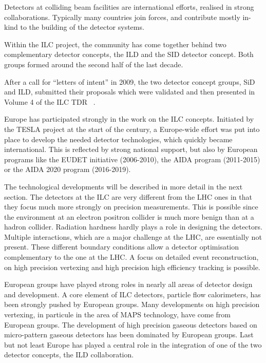\documentclass[%
 reprint,
 amsmath,amssymb,
 aps,
]{revtex4-1}
\begin{document}
Detectors at colliding beam facilities are international efforts, realised in strong collaborations. Typically many countries join forces, and contribute mostly in-kind to the building of the detector systems. 

Within the ILC project, the community has come together behind two complementary detector concepts, the ILD and the SID detector concept. Both groups formed around the second half of the last decade. 

After a call for ``letters of intent'' in 2009, the two detector concept groups,  SiD and ILD, submitted their proposals which were validated and then presented in Volume 4 of the ILC TDR ~\cite{ILC-TDR}.

Europe has participated strongly in the work on the ILC concepts. Initiated by the TESLA project at the start of the century, a Europe-wide effort was put into place to develop the needed detector technologies, which quickly became international. This is reflected by strong national support, but also by European programs like the EUDET initiative (2006-2010), the AIDA program (2011-2015) or the AIDA 2020 program (2016-2019).

The technological developments will be described in more detail in the next section. The detectors at the ILC are very different from the LHC ones in that they focus much more strongly on precision measurements. This is possible since the environment at an electron positron collider is much more benign than at a hadron collider. Radiation hardness hardly plays a role in designing the detectors. Multiple interactions, which are a major challenge at the LHC, are essentially not present. These different boundary conditions allow a detector optimisation complementary to the one at the LHC. A focus on detailed event reconstruction, on high precision vertexing and high precision high efficiency tracking is possible. 

European groups have played strong roles in nearly all areas of detector design and development. A core element of ILC detectors, particle flow calorimeters, has been strongly pushed by European groups. Many developments on high precision vertexing, in particule in the area of MAPS technology, have come from European groups. The development of high precision gaseous detectors based on micro-pattern gaseous detectors has been dominated by European groups. Last but not least Europe has played a central role in the integration of one of the two detector concepts, the ILD collaboration.  
\end{document}

